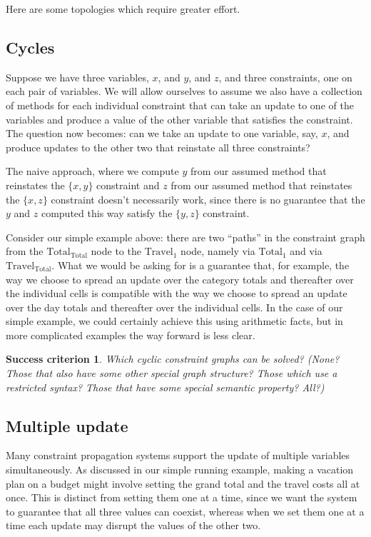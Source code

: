 \documentclass{article}
\newtheorem{success}{Success criterion}
\begin{document}
Here are some topologies which require greater effort.

\subsection{Cycles}
Suppose we have three variables, $x$, and $y$, and $z$, and three
constraints, one on each pair of variables. We will allow ourselves to
assume we also have a collection of methods for each individual constraint
that can take an update to one of the variables and produce a value of the
other variable that satisfies the constraint. The question now becomes: can
we take an update to one variable, say, $x$, and produce updates to the
other two that reinstate all three constraints?

The naive approach, where we compute $y$ from our assumed method that
reinstates the $\{x,y\}$ constraint and $z$ from our assumed method that
reinstates the $\{x,z\}$ constraint doesn't necessarily work, since there is
no guarantee that the $y$ and $z$ computed this way satisfy the $\{y,z\}$
constraint.

Consider our simple example above: there are two ``paths'' in the constraint
graph from the $\mathrm{Total}_\mathrm{Total}$ node to the
$\mathrm{Travel}_1$ node, namely via $\mathrm{Total}_1$ and via
$\mathrm{Travel}_\mathrm{Total}$. What we would be asking for is a guarantee
that, for example, the way we choose to spread an update over the category
totals and thereafter over the individual cells is compatible with the way
we choose to spread an update over the day totals and thereafter over the
individual cells. In the case of our simple example, we could certainly
achieve this using arithmetic facts, but in more complicated examples the
way forward is less clear.

\begin{success}
Which cyclic constraint graphs can be solved? (None? Those
that also have some other special graph structure? Those which use a
restricted syntax? Those that have some special semantic property? All?)
\end{success}

\subsection{Multiple update}
Many constraint propagation systems support the update of multiple variables
simultaneously. As discussed in our simple running example, making a
vacation plan on a budget might involve setting the grand total and the
travel costs all at once. This is distinct from setting them one at a time,
since we want the system to guarantee that all three values can coexist,
whereas when we set them one at a time each update may disrupt the values of
the other two.
\end{document}
